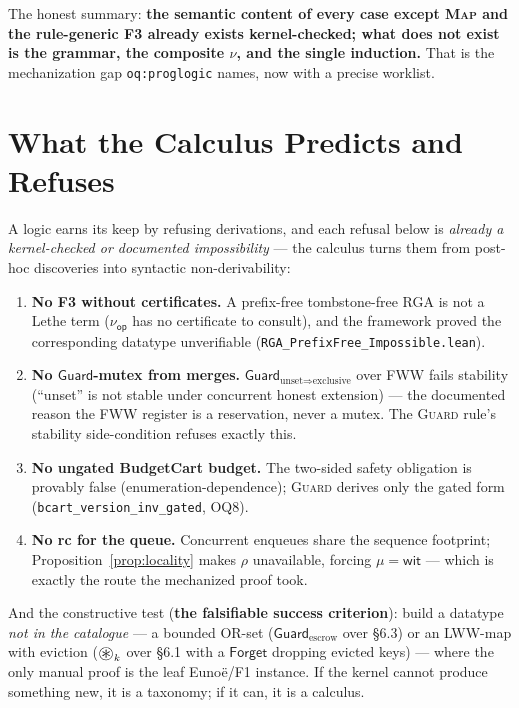 \documentclass[11pt]{article}
\newcommand{\lean}[1]{\texttt{#1}}
\newcommand{\Forget}{\mathsf{Forget}}
\newcommand{\Guard}{\mathsf{Guard}}
\newcommand{\nuop}{\nu_{\mathsf{op}}}
\newcommand{\sepmap}{\mathop{\vcenter{\hbox{\Large$\circledast$}}}}
\newcommand{\wit}{\mathsf{wit}}
\begin{document}
The honest summary: \textbf{the semantic content of every case except
\textsc{Map} and the rule-generic F3 already exists kernel-checked; what
does not exist is the grammar, the composite $\nu$, and the single
induction.} That is the mechanization gap \lean{oq:proglogic} names, now
with a precise worklist.

\section{What the Calculus Predicts and Refuses}\label{sec:refusals}

A logic earns its keep by refusing derivations, and each refusal below is
\emph{already a kernel-checked or documented impossibility} --- the
calculus turns them from post-hoc discoveries into syntactic
non-derivability:

\begin{enumerate}[leftmargin=2em]
\item \textbf{No F3 without certificates.} A prefix-free tombstone-free
  RGA is not a Lethe term ($\nuop$ has no certificate to consult), and the
  framework proved the corresponding datatype unverifiable
  (\lean{RGA\_PrefixFree\_Impossible.lean}).
\item \textbf{No $\Guard$-mutex from merges.}
  $\Guard_{\text{unset} \Rightarrow \text{exclusive}}$ over FWW fails
  stability (``unset'' is not stable under concurrent honest extension)
  --- the documented reason the FWW register is a reservation, never a
  mutex. The \textsc{Guard} rule's stability side-condition refuses
  exactly this.
\item \textbf{No ungated BudgetCart budget.} The two-sided safety
  obligation is provably false (enumeration-dependence); \textsc{Guard}
  derives only the gated form (\lean{bcart\_version\_inv\_gated}, OQ8).
\item \textbf{No rc for the queue.} Concurrent enqueues share the
  sequence footprint; Proposition~\ref{prop:locality} makes $\rho$
  unavailable, forcing $\mu = \wit$ --- which is exactly the route the
  mechanized proof took.
\end{enumerate}

And the constructive test (\textbf{the falsifiable success criterion}):
build a datatype \emph{not in the catalogue} --- a bounded OR-set
($\Guard_{\text{escrow}}$ over \S6.3) or an LWW-map with eviction
($\sepmap_k$ over \S6.1 with a $\Forget$ dropping evicted keys) --- where
the only manual proof is the leaf Euno\"e/F1 instance. If the kernel
cannot produce something new, it is a taxonomy; if it can, it is a
calculus.
\end{document}
